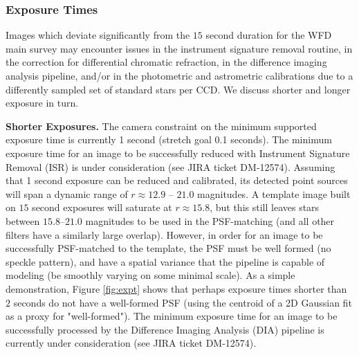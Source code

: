 \documentclass[DM,lsstdoc,toc]{lsstdoc}
\begin{document}
\subsubsection{Exposure Times}

Images which deviate significantly from the $15$ second duration for the WFD main survey may encounter issues in the instrument signature removal routine, in the correction for differential chromatic refraction, in the difference imaging analysis pipeline, and/or in the photometric and astrometric calibrations due to a differently sampled set of standard stars per CCD. We discuss shorter and longer exposure in turn.

\textbf{Shorter Exposures.} The camera constraint on the minimum supported exposure time is currently 1 second (stretch goal 0.1 seconds). The minimum exposure time for an image to be successfully reduced with Instrument Signature Removal (ISR) is under consideration (see JIRA ticket DM-12574). Assuming that 1 second exposure can be reduced and calibrated, its detected point sources will span a dynamic range of $r \approx 12.9$ -- $21.0$ magnitudes. A template image built on $15$ second exposures will saturate at $r \approx 15.8$, but this still leaves stars between $15.8$--$21.0$ magnitudes to be used in the PSF-matching (and all other filters have a similarly large overlap). However, in order for an image to be successfully PSF-matched to the template, the PSF must be well formed (no speckle pattern), and have a spatial variance that the pipeline is capable of modeling (be smoothly varying on some minimal scale). As a simple demonstration, Figure \ref{fig:expt} shows that perhaps exposure times shorter than $2$ seconds do not have a well-formed PSF (using the centroid of a 2D Gaussian fit as a proxy for "well-formed"). The minimum exposure time for an image to be successfully processed by the Difference Imaging Analysis (DIA) pipeline is currently under consideration (see JIRA ticket DM-12574).
\end{document}

